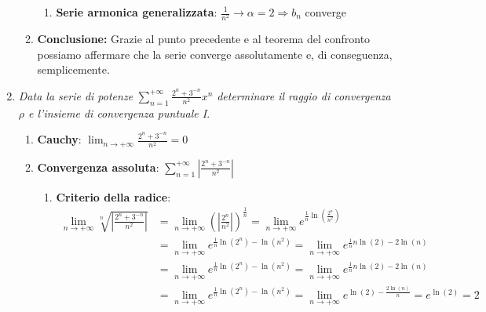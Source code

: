 \documentclass[10pt, a4paper]{article}
\begin{document}
\begin{enumerate}
\begin{enumerate}
\begin{enumerate}
                    \item \textbf{Serie armonica generalizzata}: $\frac{1}{n^2}\rightarrow  \alpha=2\Rightarrow b_n$ converge
                \end{enumerate}
                \item \textbf{Conclusione:} Grazie al punto precedente e al teorema del confronto possiamo affermare che la serie converge assolutamente e, di conseguenza, semplicemente.
            \end{enumerate}
            \item \textit{Data la serie di potenze} $\sum_{n=1}^{+\infty}\frac{2^n+3^{-n}}{n^2}x^n$ \textit{determinare il raggio di convergenza $\rho$ e l'insieme di convergenza puntuale I}. \begin{enumerate}
                \item \textbf{Cauchy}: $\lim_{n\rightarrow+\infty}\frac{2^n+3^{-n}}{n^2}=0$
                \item \textbf{Convergenza assoluta}: $\sum_{n=1}^{+\infty}\left|\frac{2^n+3^{-n}}{n^2}\right|$ 
                \begin{enumerate}
                    \item \textbf{Criterio della radice}: \begin{equation*}
                        \begin{split}
                            \lim_{n\rightarrow+\infty}\sqrt[n]{\left|\frac{2^n+3^{-n}}{n^2}\right|}&=\lim_{n\rightarrow+\infty}\left(\left|\frac{2^n}{n^2}\right|\right)^{\frac{1}{n}}=\lim_{n\rightarrow+\infty}e^{\frac{1}{n}\ln\left(\frac{2^n}{n^2}\right)}\\
                            &=\lim_{n\rightarrow+\infty}e^{\frac{1}{n}\ln\left({2^n}\right)-\ln\left({n^2}\right)}=\lim_{n\rightarrow+\infty}e^{\frac{1}{n}n\ln\left({2}\right)-2\ln\left({n}\right)}\\
                            &=\lim_{n\rightarrow+\infty}e^{\frac{1}{n}\ln\left({2^n}\right)-\ln\left({n^2}\right)}=\lim_{n\rightarrow+\infty}e^{\frac{1}{n}n\ln\left({2}\right)-2\ln\left({n}\right)}\\
                            &=\lim_{n\rightarrow+\infty}e^{\frac{1}{n}\ln\left({2^n}\right)-\ln\left({n^2}\right)}=\lim_{n\rightarrow+\infty}e^{\ln\left({2}\right)-\frac{2\ln\left({n}\right)}{n}}=e^{\ln(2)}=2
                        \end{split}

\end{equation*}
\end{enumerate}
\end{enumerate}
\end{enumerate}
\end{document}
